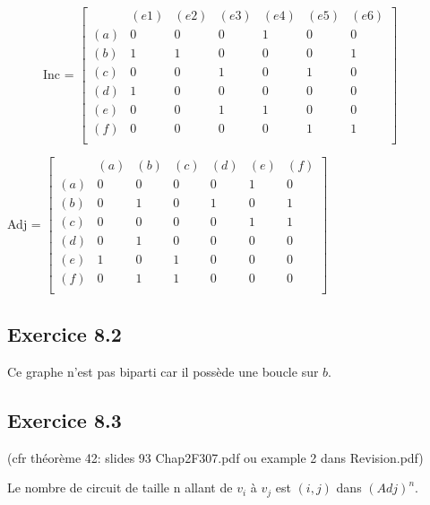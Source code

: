 \documentclass[fontsize=10pt]{article}
\begin{document}
\begin{figure}[!htb]
    \centering
    \begin{minipage}{.7\textwidth}
        Inc = $\begin{bmatrix}
            &(e1)&(e2)&(e3)&(e4)&(e5)&(e6)\\
            (a)&0&0&0&1&0&0\\
            (b)&1&1&0&0&0&1\\
            (c)&0&0&1&0&1&0\\
            (d)&1&0&0&0&0&0\\
            (e)&0&0&1&1&0&0\\
            (f)&0&0&0&0&1&1\\
        \end{bmatrix}$
    \end{minipage}%
    \begin{minipage}{.3\textwidth}
    \end{minipage}
\end{figure}
Adj = $\begin{bmatrix}
    &(a)&(b)&(c)&(d)&(e)&(f)\\
    (a)&0&0&0&0&1&0\\
    (b)&0&1&0&1&0&1\\
    (c)&0&0&0&0&1&1\\
    (d)&0&1&0&0&0&0\\
    (e)&1&0&1&0&0&0\\
    (f)&0&1&1&0&0&0\\
\end{bmatrix}$

\subsection*{Exercice 8.2}
Ce graphe n'est pas biparti car il possède une boucle sur $b$.

\subsection*{Exercice 8.3}
(cfr théorème 42: slides 93 Chap2F307.pdf ou example 2 dans Revision.pdf)
\par Le nombre de circuit de taille n allant de $v_i$ à $v_j$ est $(i,j)$ dans
$(Adj)^n$.
\end{document}
